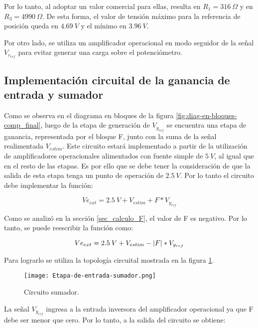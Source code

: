 Por lo tanto, al adoptar un valor comercial para ellas, resulta en $R_1 = 316 \:\Omega$ y en $R_3 = 4990 \:\Omega$. De esta forma, el valor de tensión máximo para la referencia de posición queda en $4.69\:V$ y el mínimo en $3.96\:V$.

Por otro lado, se utiliza un amplificador operacional en modo seguidor de la señal $V_{r_{ref}}$ para evitar generar una carga sobre el potenciómetro. 

\subsection{Implementación circuital de la ganancia de entrada y sumador}

Como se observa en el diagrama en bloques de la figura \ref{fig:diag-en-bloques-comp_final}, luego de la etapa de generación de $V_{y_{ref}}$ se encuentra una etapa de ganancia, representada por el bloque F, junto con la suma de la señal realimentada $V_{estim}$. Este circuito estará implementado a partir de la utilización de amplificadores operacionales alimentados con fuente simple de $5\:V$, al igual que en el resto de las etapas. Es por ello que se debe tener la consideración de que la salida de esta etapa tenga un punto de operación de $2.5\:V$. Por lo tanto el circuito debe implementar la función:

\begin{equation*} 
	Ve_{ext}= 2.5\:V + V_{estim} + F*V_{y_{ref}}
\end{equation*}

Como se analizó en la sección \ref{sec_calculo_F}, el valor de F es negativo. Por lo tanto, se puede reescribir la función como:

\begin{equation} \label{eq_transferencia_veext}
	Ve_{ext}= 2.5\:V + V_{estim} - \lvert F\rvert*V_{y_{ref}}
\end{equation}

Para lograrlo se utiliza la topología circuital mostrada en la figura \ref{fig:etapa-de-entrada-sumador}.

\begin{figure}[H]
	\centering
	\texttt{[image: Etapa-de-entrada-sumador.png]}
	\caption{Circuito sumador.}
	\label{fig:etapa-de-entrada-sumador}
\end{figure}

La señal $V_{y_{ref}}$ ingresa a la entrada inversora del amplificador operacional ya que F debe ser menor que cero. Por lo tanto, a la salida del circuito se obtiene:

